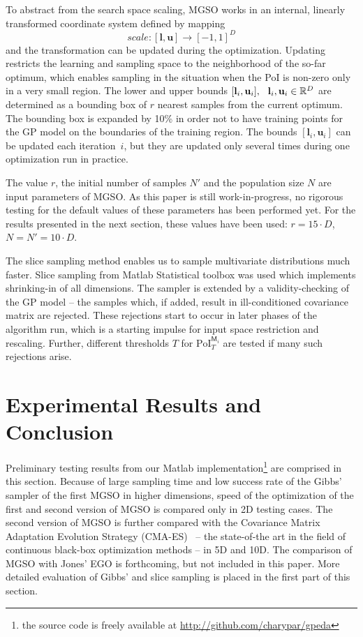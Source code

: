 \documentclass{itatnew}
\begin{document}
To abstract from the search space scaling, MGSO works in an internal, linearly transformed coordinate system defined by mapping
\begin{equation}
\mathit{scale}:[\mathbf{l}, \mathbf{u}] \rightarrow [-1, 1]^D
\end{equation}
and the transformation can be updated during the optimization. Updating restricts the learning and sampling space to the neighborhood of the so-far optimum, which enables sampling in the situation when the PoI is non-zero only in a very small region. The lower and upper bounds $[\mathbf{l}_i, \mathbf{u}_i], \hspace{0.7em} \mathbf{l}_i,\mathbf{u}_i \in \mathbb{R}^D$ are determined as a bounding box of $r$ nearest samples from the current optimum. 
The bounding box is expanded by 10\% in order not to have training points for the GP model on the boundaries of the training region.
The bounds $[\mathbf{l}_i, \mathbf{u}_i]$ can be updated each iteration~$i$, but they are updated only several times during one optimization run in practice.

The value $r$, the initial number of samples $N'$ and the population size $N$ are input parameters of MGSO. As this paper is still work-in-progress, no rigorous testing for the default values of these parameters has been performed yet. For the results presented in the next section, these values have been used: $r = 15 \cdot D$, $N = N' = 10 \cdot D$.


The slice sampling method enables us to sample multivariate distributions much faster. Slice sampling from Matlab Statistical toolbox was used which implements shrinking-in of all dimensions. The sampler is extended by a validity-checking of the GP model -- the samples which, if added, result in ill-con\-di\-tion\-ed covariance matrix are rejected. These rejections start to occur in later phases of the algorithm run, which is a starting impulse for input space restriction and rescaling. Further, different thresholds $T$ for $\mathrm{PoI}_T^{\mathsf{M}_i}$ are tested if many such rejections arise.

\section{Experimental Results and Conclusion}
\label{sec:results}

Preliminary testing results from our Matlab implementation\footnote{the source code is freely available at \url{http://github.com/charypar/gpeda}} are comprised in this section. Because of large sampling time and low success rate of the Gibbs' sampler of the first MGSO in higher dimensions, speed of the optimization of the first and second version of MGSO is compared only in 2D testing cases. The second version of MGSO is further compared with the Covariance Matrix Adaptation Evolution Strategy (CMA-ES)~\cite{hansen_completely_2001} -- the state-of-the art in the field of continuous black-box optimization methods -- in 5D and 10D. The comparison of MGSO with Jones' EGO is forthcoming, but not included in this paper. More detailed evaluation of Gibbs' and slice sampling is placed in the first part of this section.
\end{document}
